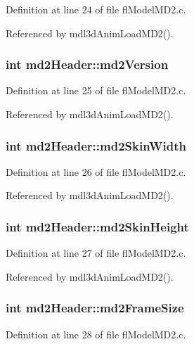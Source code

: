 Definition at line 24 of file fl\-Model\-MD2.c.

Referenced by mdl3d\-Anim\-Load\-MD2().
\subsubsection{\setlength{\rightskip}{0pt plus 5cm}int {\bf md2Header::md2Version}}\label{structmd2Header_dde91619edd2aa08c17e48677e4c7e28}




Definition at line 25 of file fl\-Model\-MD2.c.

Referenced by mdl3d\-Anim\-Load\-MD2().
\subsubsection{\setlength{\rightskip}{0pt plus 5cm}int {\bf md2Header::md2Skin\-Width}}\label{structmd2Header_bd3e1e622d83e1fb7d6e8268936aab79}




Definition at line 26 of file fl\-Model\-MD2.c.

Referenced by mdl3d\-Anim\-Load\-MD2().
\subsubsection{\setlength{\rightskip}{0pt plus 5cm}int {\bf md2Header::md2Skin\-Height}}\label{structmd2Header_1d07f9f0b1606a5a52ed73d7dc419b16}




Definition at line 27 of file fl\-Model\-MD2.c.

Referenced by mdl3d\-Anim\-Load\-MD2().
\subsubsection{\setlength{\rightskip}{0pt plus 5cm}int {\bf md2Header::md2Frame\-Size}}\label{structmd2Header_8a0d627abf368f1987ce853c335b25b9}




Definition at line 28 of file fl\-Model\-MD2.c.

